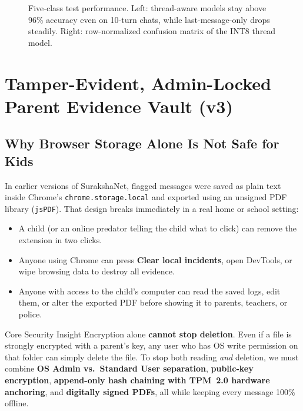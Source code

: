 \documentclass[11pt,a4paper]{article}
\begin{document}
\begin{figure}[H]
  \centering
  \begin{minipage}[c]{0.55\textwidth}\centering
    \resizebox{\linewidth}{!}{}
  \end{minipage}\hfill
  \begin{minipage}[c]{0.42\textwidth}\centering
    \resizebox{0.92\linewidth}{!}{}
  \end{minipage}
  \caption{Five-class test performance. Left: thread-aware models stay above 96\% accuracy even on 10-turn chats, while last-message-only drops steadily. Right: row-normalized confusion matrix of the INT8 thread model.}
  \label{fig:results2}
\end{figure}

\clearpage
\section{Tamper-Evident, Admin-Locked Parent Evidence Vault (v3)}\label{sec:vault}

\subsection{Why Browser Storage Alone Is Not Safe for Kids}
In earlier versions of SurakshaNet, flagged messages were saved as plain text inside Chrome's \texttt{chrome.storage.local} and exported using an unsigned PDF library (\texttt{jsPDF}). That design breaks immediately in a real home or school setting:

\begin{itemize}
  \item A child (or an online predator telling the child what to click) can remove the extension in two clicks.
  \item Anyone using Chrome can press \textbf{Clear local incidents}, open DevTools, or wipe browsing data to destroy all evidence.
  \item Anyone with access to the child's computer can read the saved logs, edit them, or alter the exported PDF before showing it to parents, teachers, or police.
\end{itemize}

\begin{takeawaybox}{Core Security Insight}
Encryption alone \textbf{cannot stop deletion}. Even if a file is strongly encrypted with a parent's key, any user who has OS write permission on that folder can simply delete the file. To stop both reading \emph{and} deletion, we must combine \textbf{OS Admin vs.\ Standard User separation}, \textbf{public-key encryption}, \textbf{append-only hash chaining with TPM~2.0 hardware anchoring}, and \textbf{digitally signed PDFs}, all while keeping every message 100\% offline.
\end{takeawaybox}
\end{document}
